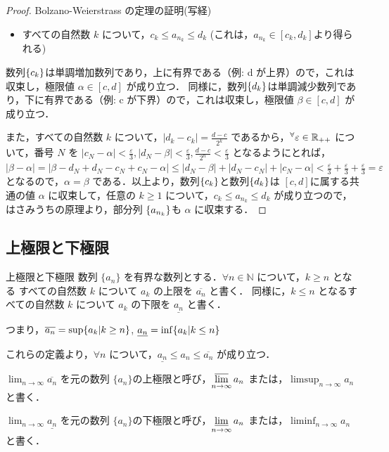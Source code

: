 \documentclass[xelatex,ja=standard,jafont=noto]{bxjsarticle}
\begin{document}
\begin{proof}{Bolzano-Weierstrass の定理の証明(写経)}{}
\begin{itemize}
      \item すべての自然数 $k$ について，$c_k \leq a_{n_k} \leq d_k$ (これは，$a_{n_k} \in [c_k, d_k]$より得られる)
     \end{itemize}

     数列$\{c_k\}$は単調増加数列であり，上に有界である（例: d が上界）ので，これは収束し，極限値 $\alpha \in [c, d]$ が成り立つ．
     同様に，数列$\{d_k\}$は単調減少数列であり，下に有界である（例: c が下界）ので，これは収束し，極限値 $\beta \in [c, d]$ が成り立つ．

     また，すべての自然数 $k$ について，$|d_k - c_k| = \frac{d-c}{2^k}$ であるから，$\forall \varepsilon \in \R_{++}$ について，番号 $N$ を $|c_N - \alpha| < \frac{\varepsilon}{3}, |d_N - \beta| < \frac{\varepsilon}{3}, \frac{d - c}{2^n} < \frac{\varepsilon}{3}$ となるようにとれば，
     $|\beta - \alpha| = |\beta - d_N + d_N - c_N + c_N - \alpha| \leq |d_N - \beta| + |d_N - c_N| + |c_N - \alpha| < \frac{\varepsilon}{3} + \frac{\varepsilon}{3} + \frac{\varepsilon}{3} = \varepsilon$
     となるので，$\alpha = \beta$ である．以上より，数列$\{c_k\}$と数列$\{d_k\}$は $[c, d]$に属する共通の値 $\alpha$ に収束して，任意の $k \geq 1$ について，$c_k \leq a_{n_k} \leq d_k$ が成り立つので，はさみうちの原理より，部分列 $\{a_{n_k}\}$も $\alpha$ に収束する．
   \end{proof}

  \subsection{上極限と下極限}

  \begin{tcb}{上極限と下極限}{}
   数列 $\{a_n\}$ を有界な数列とする．$\forall n \in \mathbb{N}$ について，$k \geq n$ となる すべての自然数 $k$ について $a_k$ の上限を $\overline{a_n}$ と書く． 
   同様に，$k \leq n$ となるすべての自然数 $k$ について $a_k$ の下限を $\underline{a_n}$ と書く．

   つまり，$\overline{a_n} = {\sup\{a_k | k \geq n\}}$, $\underline{a_n} ={\inf\{a_k | k \leq n\}}$ 

   これらの定義より，$\forall n$ について，$\underline{a_n} \leq a_n \leq \overline{a_n}$ が成り立つ．

   $\displaystyle \lim_{n \to \infty} \overline{a_n}$ を元の数列 $\{a_n\} $の上極限と呼び，$\displaystyle \varlimsup_{n \to \infty} a_n$ または，$\displaystyle \limsup_{n \to \infty} a_n$ と書く．

   $\displaystyle \lim_{n \to \infty} \underline{a_n}$ を元の数列 $\{a_n\} $の下極限と呼び，$\displaystyle \varliminf_{n \to \infty} a_n$ または，$\displaystyle \liminf_{n \to \infty} a_n$ と書く．

  \end{tcb}
\end{document}
